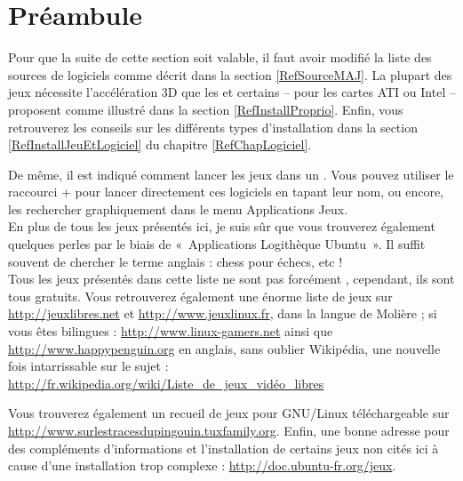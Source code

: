 \section{Préambule}
Pour que la suite de cette section soit valable, il faut avoir modifié la liste des sources de logiciels comme décrit dans la section \ref{RefSourceMAJ}. La plupart des jeux nécessite l'accélération 3D que les   et certains  -- pour les cartes ATI ou Intel -- proposent comme illustré dans la section \ref{RefInstallProprio}. Enfin, vous retrouverez les conseils sur les différents types d'installation dans la section \ref{RefInstallJeuEtLogiciel} du chapitre \ref{RefChapLogiciel}.\par
De même, il est indiqué comment lancer les jeux dans un . Vous pouvez utiliser le raccourci  +  pour lancer directement ces logiciels en tapant leur nom, ou encore, les rechercher graphiquement dans le menu Applications \FlecheDroite Jeux.\\
En plus de tous les jeux présentés ici, je suis sûr que vous trouverez également quelques perles par le biais de «~Applications \FlecheDroite Logithèque Ubuntu~». Il suffit souvent de chercher le terme anglais : chess pour échecs, etc !\\
Tous les jeux présentés dans cette liste ne sont pas forcément , cependant, ils sont tous gratuits. Vous retrouverez également une  énorme liste de jeux sur \url{http://jeuxlibres.net} et \url{http://www.jeuxlinux.fr}, dans la langue de Molière ; si vous êtes bilingues : \url{http://www.linux-gamers.net} ainsi que \url{http://www.happypenguin.org} en anglais, sans oublier Wikipédia, une nouvelle fois intarrissable sur le sujet : \url{http://fr.wikipedia.org/wiki/Liste_de_jeux_vidéo_libres}\par
Vous trouverez également un recueil de jeux pour GNU/Linux téléchargeable sur \url{http://www.surlestracesdupingouin.tuxfamily.org}. Enfin, une bonne adresse pour des compléments d'informations et l'installation de certains jeux non cités ici à cause d'une installation trop complexe : \url{http://doc.ubuntu-fr.org/jeux}.
\newpage
